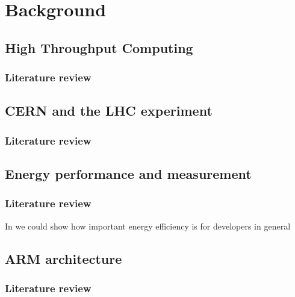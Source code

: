 \chapter{Background}

\section{High Throughput Computing}
\subsection{Literature review}

\section{CERN and the LHC experiment}
\subsection{Literature review}

\section{Energy performance and measurement}
\subsection{Literature review}

In \cite{QUESTIONS_ENERGY} we could show how important energy efficiency is for
developers in general

\section{ARM architecture}
\subsection{Literature review}



